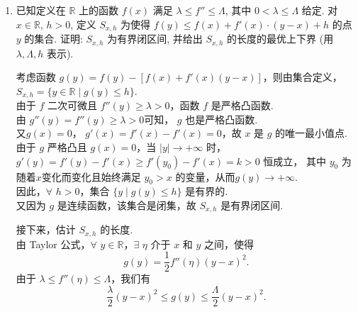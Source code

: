 \begin{enumerate}
    \item[4.]已知定义在 \(\mathbb{R}\) 上的函数 \(f(x)\) 满足 \(\displaystyle\lambda \leq f'' \leq \Lambda\), 
    其中 \(\displaystyle 0 < \lambda \leq \Lambda\) 给定. 对 \(x \in \mathbb{R}\), \(h > 0\), 定义 \(S_{x,h}\) 为使得
    \(\displaystyle f(y) \leq f(x) + f'(x) \cdot (y - x) + h\) 的点 \(y\) 的集合. 
    证明: \(\displaystyle S_{x,h}\) 为有界闭区间, 并给出 \(S_{x,h}\) 的长度的最优上下界 (用 \(\displaystyle \lambda, \Lambda, h\) 表示).
    \begin{solution}
        考虑函数 \(g(y) = f(y) - [f(x) + f'(x)(y - x)]\)，则由集合定义，\(S_{x,h} = \{ y \in \mathbb{R} \mid g(y) \leq h \}\). \\
        由于 \(f\) 二次可微且 \(f''(y) \geq \lambda > 0\)，函数 \(f\) 是严格凸函数. \\
        由 \(g''(y) = f''(y) \geq \lambda > 0\)可知， \(g\) 也是严格凸函数. \\
        又\(g(x) = 0\)， \(g'(x) = f'(x) - f'(x) = 0\)，故 \(x\) 是 \(g\) 的唯一最小值点. \\
        由于 \(g\) 严格凸且 \(g(x) = 0\)，当 \(|y| \to +\infty\) 时，$g'(y)=f'(y)-f'(x)\geq f'(y_0)-f'(x)=k>0$ 恒成立，
        其中 $y_0$ 为随着$x$变化而变化且始终满足 $y_0>x$ 的变量，从而\(g(y) \to +\infty\). \\
        因此，$\forall$ \(h > 0\)，集合 \(\{ y \mid g(y) \leq h \}\) 是有界的. \\
        又因为 \(g\) 是连续函数，该集合是闭集，故 \(S_{x,h}\) 是有界闭区间.

        接下来，估计 \(S_{x,h}\) 的长度. \\
        由 Taylor 公式，$\forall$ \(y \in \mathbb{R}\)，$\exists$ \(\eta\) 介于 \(x\) 和 \(y\) 之间，使得
        \[
        g(y) = \frac{1}{2} f''(\eta) (y - x)^2.
        \]
        由于 \(\lambda \leq f''(\eta) \leq \Lambda\)，我们有
        \[
        \frac{\lambda}{2} (y - x)^2 \leq g(y) \leq \frac{\Lambda}{2} (y - x)^2.
        \]


\end{solution}
\end{enumerate}
